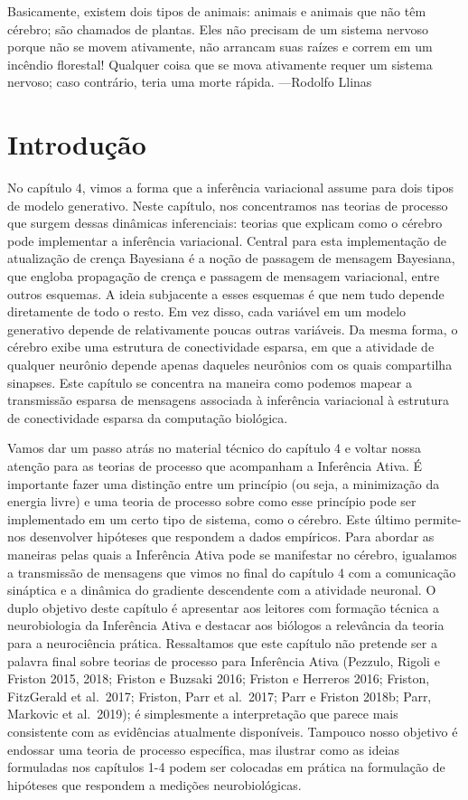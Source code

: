 \documentclass[
  12pt,
]{book}
\begin{document}
Basicamente, existem dois tipos de animais: animais e animais que não têm cérebro; são chamados de plantas. Eles não precisam de um sistema nervoso porque não se movem ativamente, não arrancam suas raízes e correm em um incêndio florestal! Qualquer coisa que se mova ativamente requer um sistema nervoso; caso contrário, teria uma morte rápida. ---Rodolfo Llinas

\hypertarget{introduuxe7uxe3o-4}{%
\section{Introdução}\label{introduuxe7uxe3o-4}}

No capítulo 4, vimos a forma que a inferência variacional assume para dois tipos de modelo generativo. Neste capítulo, nos concentramos nas teorias de processo que surgem dessas dinâmicas inferenciais: teorias que explicam como o cérebro pode implementar a inferência variacional. Central para esta implementação de atualização de crença Bayesiana é a noção de passagem de mensagem Bayesiana, que engloba propagação de crença e passagem de mensagem variacional, entre outros esquemas. A ideia subjacente a esses esquemas é que nem tudo depende diretamente de todo o resto. Em vez disso, cada variável em um modelo generativo depende de relativamente poucas outras variáveis. Da mesma forma, o cérebro exibe uma estrutura de conectividade esparsa, em que a atividade de qualquer neurônio depende apenas daqueles neurônios com os quais compartilha sinapses. Este capítulo se concentra na maneira como podemos mapear a transmissão esparsa de mensagens associada à inferência variacional à estrutura de conectividade esparsa da computação biológica.

Vamos dar um passo atrás no material técnico do capítulo 4 e voltar nossa atenção para as teorias de processo que acompanham a Inferência Ativa. É importante fazer uma distinção entre um princípio (ou seja, a minimização da energia livre) e uma teoria de processo sobre como esse princípio pode ser implementado em um certo tipo de sistema, como o cérebro. Este último permite-nos desenvolver hipóteses que respondem a dados empíricos. Para abordar as maneiras pelas quais a Inferência Ativa pode se manifestar no cérebro, igualamos a transmissão de mensagens que vimos no final do capítulo 4 com a comunicação sináptica e a dinâmica do gradiente descendente com a atividade neuronal. O duplo objetivo deste capítulo é apresentar aos leitores com formação técnica a neurobiologia da Inferência Ativa e destacar aos biólogos a relevância da teoria para a neurociência prática. Ressaltamos que este capítulo não pretende ser a palavra final sobre teorias de processo para Inferência Ativa (Pezzulo, Rigoli e Friston 2015, 2018; Friston e Buzsaki 2016; Friston e Herreros 2016; Friston, FitzGerald et al.~2017; Friston, Parr et al.~2017; Parr e Friston 2018b; Parr, Markovic et al.~2019); é simplesmente a interpretação que parece mais consistente com as evidências atualmente disponíveis. Tampouco nosso objetivo é endossar uma teoria de processo específica, mas ilustrar como as ideias formuladas nos capítulos 1-4 podem ser colocadas em prática na formulação de hipóteses que respondem a medições neurobiológicas.
\end{document}
